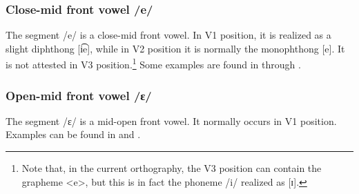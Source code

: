 \subsubsection{Close-mid front vowel /e/}
The segment /e/ is a close-mid front vowel. In V1 position, it is realized as a slight diphthong [i͡e], while in V2 position it is normally the monophthong [e]. It is not attested in V3 position.\footnote{Note that, in the current orthography, the V3 position can contain the grapheme <e>, but this is in fact the phoneme /i/ realized as [ɪ].} 
Some examples are found in  through .




\subsubsection{Open-mid front vowel /ɛ/}\label{openE}
The segment /ɛ/ is a mid-open front vowel. It normally occurs in V1 position. %
Examples can be found in  and .

